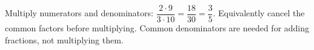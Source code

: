 Multiply numerators and denominators: $\dfrac{2\cdot9}{3\cdot10}=\dfrac{18}{30}=\boxed{\dfrac{3}{5}}$. Equivalently cancel the common factors before multiplying. Common denominators are needed for adding fractions, not multiplying them.
